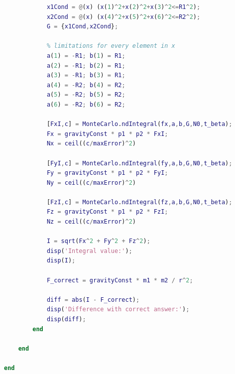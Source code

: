 \documentclass[a4paper,12pt]{article}
\begin{document}
\begin{lstlisting}[language=MATLAB]
            % conditions of G area
            x1Cond = @(x) (x(1)^2+x(2)^2+x(3)^2<=R1^2);
            x2Cond = @(x) (x(4)^2+x(5)^2+x(6)^2<=R2^2);
            G = {x1Cond,x2Cond};
            
            % limitations for every element in x
            a(1) = -R1; b(1) = R1;
            a(2) = -R1; b(2) = R1;
            a(3) = -R1; b(3) = R1;
            a(4) = -R2; b(4) = R2;
            a(5) = -R2; b(5) = R2;
            a(6) = -R2; b(6) = R2;
            
            [FxI,c] = MonteCarlo.ndIntegral(fx,a,b,G,N0,t_beta);
            Fx = gravityConst * p1 * p2 * FxI;
            Nx = ceil((c/maxError)^2)
            
            [FyI,c] = MonteCarlo.ndIntegral(fy,a,b,G,N0,t_beta);
            Fy = gravityConst * p1 * p2 * FyI;
            Ny = ceil((c/maxError)^2)
            
            [FzI,c] = MonteCarlo.ndIntegral(fz,a,b,G,N0,t_beta);
            Fz = gravityConst * p1 * p2 * FzI;
            Nz = ceil((c/maxError)^2)
            
            I = sqrt(Fx^2 + Fy^2 + Fz^2);
            disp('Integral value:');
            disp(I);
                        
            F_correct = gravityConst * m1 * m2 / r^2;
            
            diff = abs(I - F_correct);
            disp('Difference with correct answer:');
            disp(diff);
        end
        
    end
    
end
\end{lstlisting}
\end{document}
